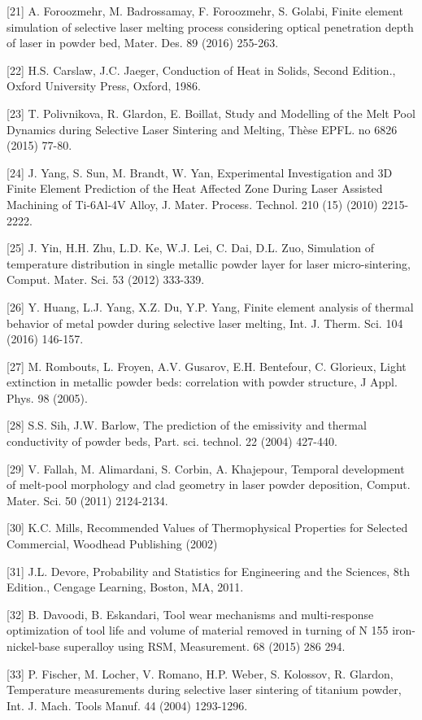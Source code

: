 \documentclass[10pt]{article}
\begin{document}
[21] A. Foroozmehr, M. Badrossamay, F. Foroozmehr, S. Golabi, Finite element simulation of selective laser melting process considering optical penetration depth of laser in powder bed, Mater. Des. 89 (2016) 255-263.

[22] H.S. Carslaw, J.C. Jaeger, Conduction of Heat in Solids, Second Edition., Oxford University Press, Oxford, 1986.

[23] T. Polivnikova, R. Glardon, E. Boillat, Study and Modelling of the Melt Pool Dynamics during Selective Laser Sintering and Melting, Thèse EPFL. no 6826 (2015) 77-80.

[24] J. Yang, S. Sun, M. Brandt, W. Yan, Experimental Investigation and 3D Finite Element Prediction of the Heat Affected Zone During Laser Assisted Machining of Ti-6Al-4V Alloy, J. Mater. Process. Technol. 210 (15) (2010) 2215-2222.

[25] J. Yin, H.H. Zhu, L.D. Ke, W.J. Lei, C. Dai, D.L. Zuo, Simulation of temperature distribution in single metallic powder layer for laser micro-sintering, Comput. Mater. Sci. 53 (2012) 333-339.

[26] Y. Huang, L.J. Yang, X.Z. Du, Y.P. Yang, Finite element analysis of thermal behavior of metal powder during selective laser melting, Int. J. Therm. Sci. 104 (2016) 146-157.

[27] M. Rombouts, L. Froyen, A.V. Gusarov, E.H. Bentefour, C. Glorieux, Light extinction in metallic powder beds: correlation with powder structure, J Appl. Phys. 98 (2005).

[28] S.S. Sih, J.W. Barlow, The prediction of the emissivity and thermal conductivity of powder beds, Part. sci. technol. 22 (2004) 427-440.

[29] V. Fallah, M. Alimardani, S. Corbin, A. Khajepour, Temporal development of melt-pool morphology and clad geometry in laser powder deposition, Comput. Mater. Sci. 50 (2011) 2124-2134.

[30] K.C. Mills, Recommended Values of Thermophysical Properties for Selected Commercial, Woodhead Publishing (2002)

[31] J.L. Devore, Probability and Statistics for Engineering and the Sciences, 8th Edition., Cengage Learning, Boston, MA, 2011.

[32] B. Davoodi, B. Eskandari, Tool wear mechanisms and multi-response optimization of tool life and volume of material removed in turning of $\mathrm{N}$ 155 iron-nickel-base superalloy using RSM, Measurement. 68 (2015) 286 294.

[33] P. Fischer, M. Locher, V. Romano, H.P. Weber, S. Kolossov, R. Glardon, Temperature measurements during selective laser sintering of titanium powder, Int. J. Mach. Tools Manuf. 44 (2004) 1293-1296.
\end{document}
